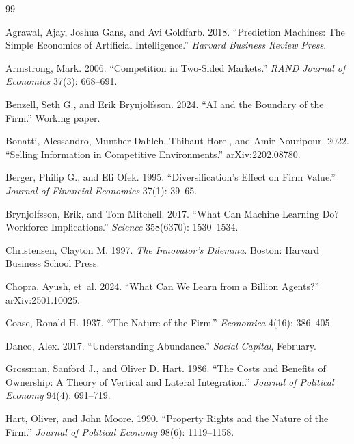 \documentclass[12pt]{article}
\theoremstyle{definition}
\begin{document}


\begin{thebibliography}{99}

Agrawal, Ajay, Joshua Gans, and Avi Goldfarb. 2018. ``Prediction Machines: The Simple Economics of Artificial Intelligence.'' \textit{Harvard Business Review Press}.

Armstrong, Mark. 2006. ``Competition in Two-Sided Markets.'' \textit{RAND Journal of Economics} 37(3): 668--691.

Benzell, Seth G., and Erik Brynjolfsson. 2024. ``AI and the Boundary of the Firm.'' Working paper.

Bonatti, Alessandro, Munther Dahleh, Thibaut Horel, and Amir Nouripour. 2022. ``Selling Information in Competitive Environments.'' arXiv:2202.08780.

Berger, Philip G., and Eli Ofek. 1995. ``Diversification's Effect on Firm Value.'' \textit{Journal of Financial Economics} 37(1): 39--65.

Brynjolfsson, Erik, and Tom Mitchell. 2017. ``What Can Machine Learning Do? Workforce Implications.'' \textit{Science} 358(6370): 1530--1534.

Christensen, Clayton M. 1997. \textit{The Innovator's Dilemma}. Boston: Harvard Business School Press.

Chopra, Ayush, et~al. 2024. ``What Can We Learn from a Billion Agents?'' arXiv:2501.10025.

Coase, Ronald H. 1937. ``The Nature of the Firm.'' \textit{Economica} 4(16): 386--405.

Danco, Alex. 2017. ``Understanding Abundance.'' \textit{Social Capital}, February.

Grossman, Sanford J., and Oliver D. Hart. 1986. ``The Costs and Benefits of Ownership: A Theory of Vertical and Lateral Integration.'' \textit{Journal of Political Economy} 94(4): 691--719.

Hart, Oliver, and John Moore. 1990. ``Property Rights and the Nature of the Firm.'' \textit{Journal of Political Economy} 98(6): 1119--1158.


\end{thebibliography}
\end{document}
